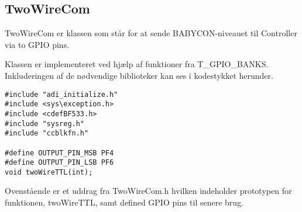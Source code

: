 \subsection{TwoWireCom}
TwoWireCom er klassen som står for at sende BABYCON-niveauet til Controller via to GPIO pins. 

Klassen er implementeret ved hjælp af funktioner fra T\_GPIO\_BANKS. Inkluderingen af de nødvendige biblioteker kan ses i kodestykket herunder. 

\begin{verbatim}
#include "adi_initialize.h"
#include <sys\exception.h>
#include <cdefBF533.h>
#include "sysreg.h"
#include "ccblkfn.h"

#define OUTPUT_PIN_MSB PF4
#define OUTPUT_PIN_LSB PF6
void twoWireTTL(int);
\end{verbatim}

Ovenstående er et uddrag fra TwoWireCom.h hvilken indeholder prototypen for funktionen, twoWireTTL, samt defined GPIO pins til senere brug.  